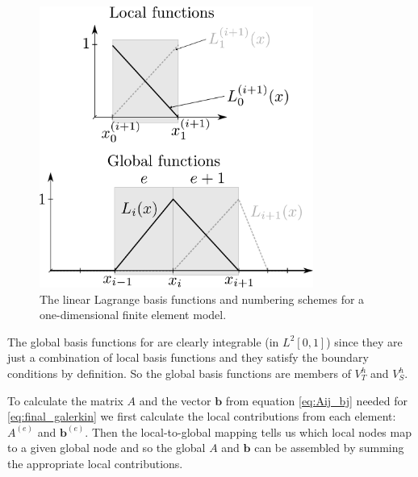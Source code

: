 \begin{figure}[!ht]
  \center
  \includegraphics[width=0.8\textwidth]{./images/local_global_functions}
  \caption{The linear Lagrange basis functions and numbering schemes for a one-dimensional
    finite element model.\label{fig:local_global_functions}}
\end{figure}

The global basis functions for are clearly integrable (\ie in $L^2[0,1]$) since
they are just a combination of local basis functions and they satisfy the boundary conditions by definition. So the global basis functions are members of $V_T^h$ and $V_S^h$.

To calculate the matrix $A$ and the vector $\mathbf{b}$ from equation
\eqref{eq:Aij_bj} needed for \eqref{eq:final_galerkin} we first calculate the
local contributions from each element: $A^{(e)}$ and $\mathbf{b}^{(e)}$. Then the
local-to-global mapping tells us which local nodes map to a given global node
and so the global $A$ and $\mathbf{b}$ can be assembled by summing the
appropriate local contributions.

